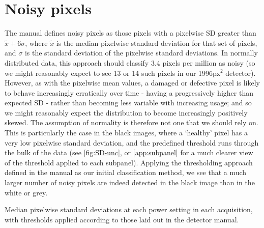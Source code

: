\documentclass[10pt,fleqn]{article}
\begin{document}

\section*{Noisy pixels}

The manual defines noisy pixels as those pixels with a pixelwise SD greater than $\tilde{x} + 6\sigma$, where $\tilde{x}$ is the median pixelwise standard deviation for that set of pixels, and $\sigma$ is the standard deviation of the pixelwise standard deviations. In normally distributed data, this approach should classify 3.4 pixels per million as noisy (so we might reasonably expect to see 13 or 14 such pixels in our 1996px$^2$ detector). However, as with the pixelwise mean values, a damaged or defective pixel is likely to behave increasingly erratically over time - having a progressively higher than expected SD - rather than becoming less variable with increasing usage; and so we might reasonably expect the distribution to become increasingly positively skewed. The assumption of normality is therefore not one that we should rely on. This is particularly the case in the black images, where a `healthy' pixel has a very low pixelwise standard deviation, and the predefined threshold runs through the bulk of the data (see \autoref{fig:SD-unc}, or \autoref{app:subpanel} for a much clearer view of the threshold applied to each subpanel). Applying the thresholding approach defined in the manual as our initial classification method, we see that a much larger number of noisy pixels are indeed detected in the black image than in the white or grey.

\begin{table}[!ht] %
\begin{footnotesize}
\caption{Median pixelwise standard deviations at each power setting in each acquisition, with thresholds applied according to those laid out in the detector manual.}

\end{footnotesize}
\end{table}
\end{document}
